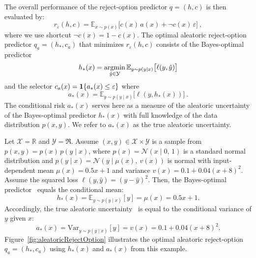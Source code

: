 The overall performance of the reject-option predictor $q=(h,c)$ is then evaluated by:
\[
   r_{\varepsilon}(h,c) =
   \mathbb{E}_{x\sim p(x)}
   \Big[
      c(x)\, a(x) + \neg c(x)\,\varepsilon
   \Big] \:,
\]
%
where we use shortcut $\neg c(x) = 1 - c(x)$. The optimal aleatoric reject-option predictor $q_a=(h_*,c_a)$ that minimizes $r_{\varepsilon}(h,c)$ consists of the Bayes-optimal predictor 
\begin{equation}
  \label{equ:BayesPredictor}
  h_*(x) = \mathop{\rm argmin}_{\hat{y}\in{\cal Y}}{\mathbb{E}}_{y\sim p(y\mid x)}\big [ \ell(y,\hat{y})\big ]
\end{equation}
and the selector $c_a(x) =\mathbf{1}{\{ {a_*(x) \leq \varepsilon}\}}$ where
\begin{equation}
  \label{equ:TrueAleatorUncertainty}
    a_*(x) = \mathbb{E}_{y\sim p(y\mid x)} \big[ \ell(y,h_*(x) ) \big]\:.
\end{equation}
%
The conditional risk $a_*(x)$ serves here as a measure of the aleatoric uncertainty of the Bayes-optimal predictor $h_*(x)$ with full knowledge of the data distribution $p(x,y)$. We refer to $a_*(x)$ as the true aleatoric uncertainty.

\begin{example}
\label{example:1}
Let $\mathcal{X} = \mathbb{R}$ and $\mathcal{Y}=\Re$. Assume $(x, y) \in \mathcal{X} \times \mathcal{Y}$ is a sample from $p(x, y) = p(x)\, p(y \mid x)$, where
$p(x) = \mathcal{N}(x \mid 0,\, 1)$ is a standard normal distribution and $p(y \mid x) = \mathcal{N}(y \mid \mu(x),\ v(x))$ is normal with input-dependent mean $\mu(x)=0.5x + 1$ and variance $v(x) = 0.1 + 0.04(x + 8)^2$. 
Assume the squared loss $\ell(y, \hat{y}) = (y - \hat{y})^2$. Then, the Bayes-optimal predictor~ equals the conditional mean:
$$
h_*(x) = \mathbb{E}_{y \sim p(y \mid x)}[y] = \mu(x)=0.5x + 1.
$$
Accordingly, the true aleatoric uncertainty~ is equal to the conditional variance of $y$ given $x$:
$$
a_*(x) = \mathrm{Var}_{y \sim p(y \mid x)}[y] = v(x) = 0.1 + 0.04(x + 8)^2.
$$
Figure~\ref{fig:aleatoricRejectOption} illustrates the optimal aleatoric reject-option $q_a=(h_*,c_a)$ using $h_*(x)$ and $a_*(x)$ from this example. %
\end{example}


